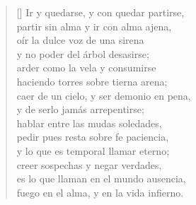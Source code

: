 \settowidth{\versewidth}{Ir y quedarse, y con quedar partirse}
\begin{verse}[\versewidth]
Ir y quedarse, y con quedar partirse, \\
partir sin alma y ir con alma ajena, \\
oír la dulce voz de una sirena \\
y no poder del árbol desasirse; \\[\baselineskip]

arder como la vela y consumirse \\
haciendo torres sobre tierna arena; \\
caer de un cielo, y ser demonio en pena, \\
y de serlo jamás arrepentirse; \\[\baselineskip]

hablar entre las mudas soledades, \\
pedir pues resta sobre fe paciencia, \\
y lo que es temporal llamar eterno; \\[\baselineskip]

creer sospechas y negar verdades, \\
es lo que llaman en el mundo ausencia, \\
fuego en el alma, y en la vida infierno. \\ 
\end{verse}
